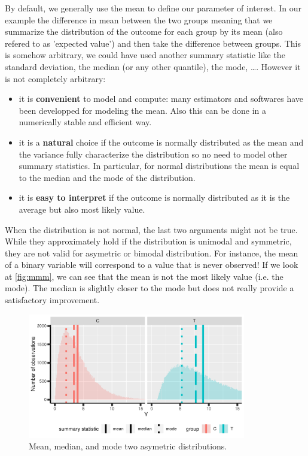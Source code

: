 \documentclass[12pt]{article}
\begin{document}
By default, we generally use the mean to define our parameter of
interest. In our example the difference in mean between the two groups
meaning that we summarize the distribution of the outcome for each
group by its mean (also refered to as 'expected value') and then take the difference
between groups. This is somehow arbitrary, we could have used another
summary statistic like the standard deviation, the median (or any
other quantile), the mode, \ldots. However it is not completely arbitrary:
\begin{itemize}
\item it is \textbf{convenient} to model and compute: many estimators and softwares
have been developped for modeling the mean. Also this can be done
in a numerically stable and efficient way.
\item it is a \textbf{natural} choice if the outcome is normally distributed as
the mean and the variance fully characterize the distribution so no
need to model other summary statistics. In particular, for normal
distributions the mean is equal to the median and the mode of the
distribution.
\item it is \textbf{easy to interpret} if the outcome is normally distributed as
it is the average but also most likely value.
\end{itemize}

When the distribution is not normal, the last two arguments might not
be true. While they approximately hold if the distribution is unimodal
and symmetric, they are not valid for asymetric or bimodal
distribution. For instance, the mean of a binary variable will
correspond to a value that is never observed! If we look at
\autoref{fig:mmm}, we can see that the mean is not the most likely value
(i.e. the mode). The median is slightly closer to the mode but does
not really provide a satisfactory improvement.

\begin{figure}[!h]
\centering
\includegraphics[width=0.85\textwidth]{./figures/meanMedianMode.pdf}
\caption{\label{fig:mmm}Mean, median, and mode two asymetric distributions.}
\end{figure}
\end{document}
